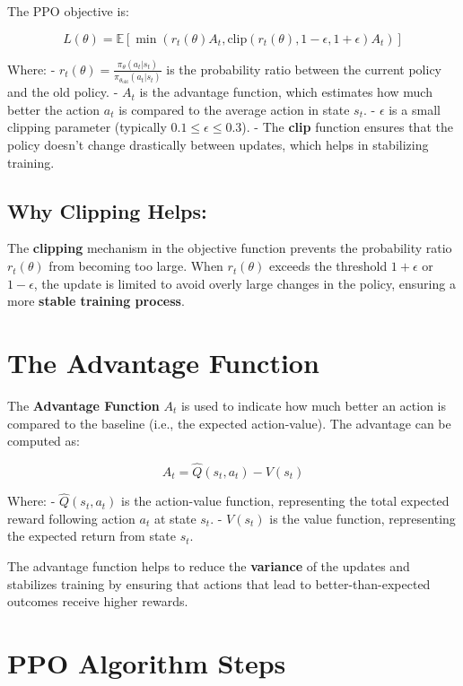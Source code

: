 \documentclass[
]{book}
\begin{document}
The PPO objective is:

\[
L(\theta) = \mathbb{E} \left[ \min \left( r_t(\theta) A_t, \text{clip}\left(r_t(\theta), 1 - \epsilon, 1 + \epsilon \right) A_t \right) \right]
\]

Where:
- \(r_t(\theta) = \frac{\pi_\theta(a_t | s_t)}{\pi_{\theta_{\text{old}}}(a_t | s_t)}\) is the probability ratio between the current policy and the old policy.
- \(A_t\) is the advantage function, which estimates how much better the action \(a_t\) is compared to the average action in state \(s_t\).
- \(\epsilon\) is a small clipping parameter (typically \(0.1 \leq \epsilon \leq 0.3\)).
- The \textbf{clip} function ensures that the policy doesn't change drastically between updates, which helps in stabilizing training.

\subsection{Why Clipping Helps:}\label{why-clipping-helps}

The \textbf{clipping} mechanism in the objective function prevents the probability ratio \(r_t(\theta)\) from becoming too large. When \(r_t(\theta)\) exceeds the threshold \(1 + \epsilon\) or \(1 - \epsilon\), the update is limited to avoid overly large changes in the policy, ensuring a more \textbf{stable training process}.

\section{The Advantage Function}\label{the-advantage-function}

The \textbf{Advantage Function} \(A_t\) is used to indicate how much better an action is compared to the baseline (i.e., the expected action-value). The advantage can be computed as:

\[
A_t = \hat{Q}(s_t, a_t) - V(s_t)
\]

Where:
- \(\hat{Q}(s_t, a_t)\) is the action-value function, representing the total expected reward following action \(a_t\) at state \(s_t\).
- \(V(s_t)\) is the value function, representing the expected return from state \(s_t\).

The advantage function helps to reduce the \textbf{variance} of the updates and stabilizes training by ensuring that actions that lead to better-than-expected outcomes receive higher rewards.

\section{PPO Algorithm Steps}\label{ppo-algorithm-steps}
\end{document}
